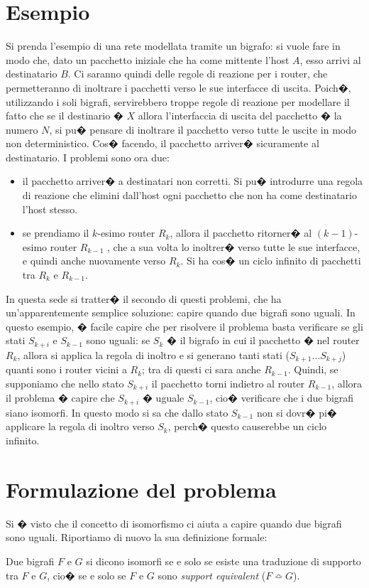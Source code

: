 \section{Esempio}\label{sub:networkExe}
Si prenda l'esempio di una rete modellata tramite un bigrafo: si vuole fare in modo che, dato un pacchetto iniziale che ha
come mittente l'host $A$, esso arrivi al destinatario $B$. Ci saranno quindi delle regole di reazione per i router, che permetteranno di inoltrare i pacchetti verso le sue interfacce di uscita. Poich�, utilizzando i soli bigrafi, servirebbero troppe regole di reazione per modellare il fatto che se il destinario � $X$ allora l'interfaccia di uscita del pacchetto � la numero $N$,  si pu� pensare di inoltrare il pacchetto verso tutte le uscite in modo non deterministico. Cos� facendo, il pacchetto arriver� sicuramente al destinatario.
I problemi sono ora due:
\begin{itemize}
	\item
	il pacchetto arriver� a destinatari non corretti. Si pu� introdurre una regola di reazione che elimini dall'host ogni pacchetto che non ha come destinatario l'host stesso.
	\item
	se prendiamo il $k$-esimo router $R_k$, allora il pacchetto ritorner� al $(k-1)$-esimo router $R_{k-1}$ , che a sua volta lo inoltrer� verso tutte le sue interfacce, e quindi 
	anche nuovamente verso $R_{k}$. Si ha cos� un ciclo infinito di pacchetti tra $R_k$ e $R_{k-1}$.
\end{itemize}

In questa sede si tratter� il secondo di questi problemi, che ha un'apparentemente semplice soluzione: capire quando due bigrafi sono uguali. In questo esempio, � 
facile capire che per risolvere il problema basta verificare se gli stati $S_{k+i}$ e $S_{k-1}$ sono uguali: se $S_{k}$ � il bigrafo in cui il pacchetto � nel router $R_{k}$, allora
si applica la regola di inoltro e si generano tanti stati ($S_{k+1} \dots S_{k+j}$) quanti sono i router vicini a $R_k$; tra di questi ci sara anche $R_{k-1}$. Quindi, se supponiamo che nello stato $S_{k+i}$ il pacchetto torni indietro al router $R_{k-1}$, allora il problema � capire che $S_{k+i}$ � uguale $S_{k-1}$, cio� verificare che i due bigrafi siano isomorfi. In questo modo si sa che dallo stato $S_{k-1}$ non si dovr� pi� applicare la regola di inoltro verso $S_{k}$, perch� questo causerebbe un ciclo infinito.

\section{Formulazione del problema}
Si � visto che il concetto di isomorfismo ci aiuta a capire quando due bigrafi sono uguali. Riportiamo di nuovo la sua definizione formale:
\begin{define}[Isomorfismo]
Due bigrafi $F$ e $G$ si dicono isomorfi se e solo se esiste una traduzione di supporto tra $F$ e $G$, cio� se e solo se $F$ e $G$ sono \emph{support equivalent} ($F \bumpeq G$).
\end{define}

